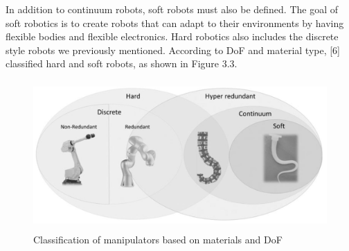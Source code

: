 \documentclass[12pt,twoside,a4]{mwbk}
\begin{document}
\noindent In addition to continuum robots, soft robots must also be defined. The goal of soft robotics is to create robots that can adapt to their environments by having flexible bodies and flexible electronics. Hard robotics also includes the discrete style robots we previously mentioned. According to DoF and material type, [6] classified hard and soft robots, as shown in Figure 3.3.

\begin{figure}[h!]
    \centering
    \includegraphics[width=12.3cm, height=5.7cm]{classification.JPG}
    \caption{Classification of manipulators based on materials and DoF}
\end{figure}
\end{document}
